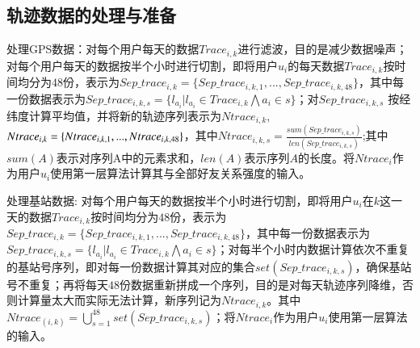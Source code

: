 \subsection{轨迹数据的处理与准备}
处理GPS数据：对每个用户每天的数据$Trace_{i,k}$进行滤波，目的是减少数据噪声；对每个用户每天的数据按半个小时进行切割，即将用户$u_{i}$的每天数据$Trace_{i,k}$按时间均分为$48$份，表示为$Sep\_trace_{i,k}=\{Sep\_trace_{i,k,1},...,Sep\_trace_{i,k,48}\}$，其中每一份数据表示为$Sep\_trace_{i,k,s}=\{l_{a_i}|l_{a_i}\in Trace_{i,k} \bigwedge a_{i} \in s\}$；对$Sep\_trace_{i,k,s}$ 按经纬度计算平均值，并将新的轨迹序列表示为$Ntrace_{i,k}$,$Ntrace_{i,k}=\{Ntrace_{i,k,1},...,\\
Ntrace_{i,k,48}\}$，其中$Ntrace_{i,k,s}=\frac{sum(Sep\_trace_{i,k,s})}{len(Sep\_trace_{i,k,s})}$;其中$sum(A)$表示对序列A中的元素求和，$len(A)$表示序列$A$的长度。将$Ntrace_{i}$作为用户$u_{i}$使用第一层算法计算其与全部好友关系强度的输入。
\par 处理基站数据: 对每个用户每天的数据按半个小时进行切割，即将用户$u_{i}$在$k$这一天的数据$Trace_{i,k}$按时间均分为$48$份，表示为$Sep\_trace_{i,k}=\{Sep\_trace_{i,k,1},...,Sep\_trace_{i,k,48}\}$，其中每一份数据表示为$Sep\_trace_{i,k,s}=\{l_{a_i}|l_{a_i}\in Trace_{i,k}\bigwedge a_{i}\in s\}$；对每半个小时内数据计算依次不重复的基站号序列，即对每一份数据计算其对应的集合$set(Sep\_trace_{i,k,s})$，确保基站号不重复；再将每天$48$份数据重新拼成一个序列，目的是对每天轨迹序列降维，否则计算量太大而实际无法计算，新序列记为$Ntrace_{i,k}$。其中$Ntrace_(i,k)=\bigcup_{s=1}^{48}set(Sep\_trace_{i,k,s})$；将$Ntrace_{i}$作为用户$u_{i}$使用第一层算法的输入。
